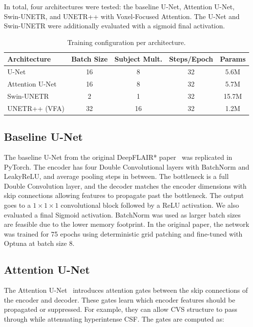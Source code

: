 \documentclass{article}
\begin{document}
In total, four architectures were tested: the baseline U-Net, Attention U-Net,
Swin-UNETR, and UNETR++ with Voxel-Focused Attention. The U-Net and Swin-UNETR
were additionally evaluated with a sigmoid final activation.

\begin{table}[h]
  \caption{Training configuration per architecture.}
  \label{tab:training}
  \centering
  \begin{tabular}{lcccc}
    \toprule
    Architecture & Batch Size & Subject Mult. & Steps/Epoch & Params \\
    \midrule
    U-Net           & 16 & 8  & 32 & 5.6M  \\
    Attention U-Net & 16 & 8  & 32 & 5.7M  \\
    Swin-UNETR      & 2  & 1  & 32 & 15.7M \\
    UNETR++ (VFA)   & 32 & 16 & 32 & 1.2M  \\
    \bottomrule
  \end{tabular}
\end{table}

\subsection{Baseline U-Net}

The baseline U-Net from the original DeepFLAIR* paper~\cite{baburyan2025deepflair} was
replicated in PyTorch. The encoder has four Double Convolutional layers with
BatchNorm and LeakyReLU, and average pooling steps in between. The bottleneck
is a full Double Convolution layer, and the decoder matches the encoder
dimensions with skip connections allowing features to propagate past the
bottleneck. The output goes to a $1{\times}1{\times}1$ convolutional block
followed by a ReLU activation. We also evaluated a final Sigmoid activation.
BatchNorm was used as larger batch sizes are feasible due to the lower memory
footprint. In the original paper, the network was trained for 75 epochs using
deterministic grid patching and fine-tuned with Optuna at batch size 8.

\subsection{Attention U-Net}

The Attention U-Net~\cite{oktay2018attention} introduces attention gates between the
skip connections of the encoder and decoder. These gates learn which encoder
features should be propagated or suppressed. For example, they can allow CVS
structure to pass through while attenuating hyperintense CSF. The gates are
computed as:
\end{document}
